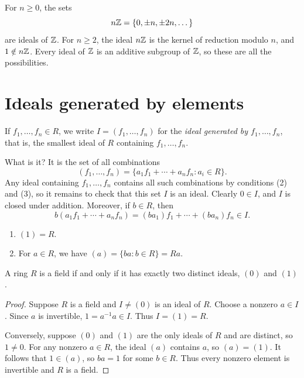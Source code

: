 \documentclass[reqno,11pt]{amsart}
\begin{document}
\begin{example}[Ideals of $\Z$]
For $n\geq0$, the sets
\[
  n\mathbb{Z}=\{0,\pm n,\pm2n,\dots\}
\]
are ideals of $\Z$. For $n\geq2$, the ideal $n\mathbb{Z}$ is the kernel of
reduction modulo $n$, and $1\notin n\mathbb{Z}$. Every ideal of $\Z$ is
an additive subgroup of $\Z$, so these are all the possibilities.
\end{example}

\section{Ideals generated by elements}

\begin{definition}
If $f_1,\dots,f_n\in R$, we write $I=(f_1,\dots,f_n)$ for the
\emph{ideal generated by $f_1,\dots,f_n$}, that is, the smallest
ideal of $R$ containing $f_1,\dots,f_n$.
\end{definition}

What is it? It is the set of all combinations
\[
  (f_1,\dots,f_n)=\{a_1f_1+\cdots+a_nf_n:a_i\in R\}.
\]
Any ideal containing $f_1,\dots,f_n$ contains all such combinations
by conditions (2) and (3), so it remains to check that this set $I$
is an ideal. Clearly $0\in I$, and $I$ is closed under addition.
Moreover, if $b\in R$, then
\[
  b(a_1f_1+\cdots+a_nf_n)=(ba_1)f_1+\cdots+(ba_n)f_n\in I.
\]

\begin{example}
\begin{enumerate}[label=(\alph*)]
  \item $(1)=R$.
  \item For $a\in R$, we have $(a)=\{ba:b\in R\}=Ra$.
\end{enumerate}
\end{example}

\begin{lemma}
A ring $R$ is a field if and only if it has exactly two distinct ideals,
$(0)$ and $(1)$.
\end{lemma}
\begin{proof}
Suppose $R$ is a field and $I\neq(0)$ is an ideal of $R$. Choose a
nonzero $a\in I$. Since $a$ is invertible, $1=a^{-1}a\in I$. Thus
$I=(1)=R$.

Conversely, suppose $(0)$ and $(1)$ are the only ideals of $R$ and
are distinct, so $1\neq0$. For any nonzero $a\in R$, the ideal $(a)$
contains $a$, so $(a)=(1)$. It follows that $1\in(a)$, so $ba=1$ for
some $b\in R$. Thus every nonzero element is invertible and $R$ is
a field.
\end{proof}
\end{document}
